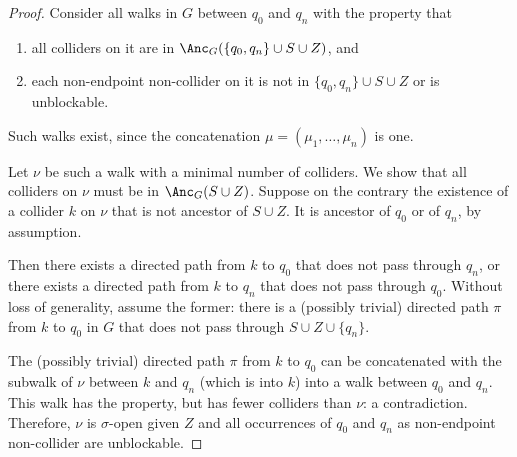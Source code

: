 \begin{proof}
  Consider all walks in $G$ between $q_0$ and $q_n$ with the property that 
  \begin{enumerate}
    \item all colliders on it are in $\Anc_{G}(\{q_0,q_n\} \cup S \cup Z)$, and 
    \item each non-endpoint non-collider on it is not in $\{q_0,q_n\} \cup S \cup Z$ or is unblockable.
  \end{enumerate}
  Such walks exist, since the concatenation $\mu = (\mu_1, \dots, \mu_n)$ is one. 

  Let $\nu$ be such a walk with a minimal number of colliders.
  We show that all colliders on $\nu$ must be in $\Anc_{G}(S \cup Z)$. 
  Suppose on the contrary the existence of a collider $k$ on $\nu$ that is not ancestor of $S \cup Z$. 
  It is ancestor of $q_0$ or of $q_n$, by assumption.

  Then there exists a directed path from $k$ to $q_0$ that does not pass through $q_n$, or there exists a directed path from $k$ to $q_n$ that does not pass through $q_0$.
  Without loss of generality, assume the former:
  there is a (possibly trivial) directed path $\pi$ from $k$ to $q_0$ in $G$ that does not pass through $S \cup Z \cup \{q_n\}$.
  
  The (possibly trivial) directed path $\pi$ from $k$ to $q_0$ can be concatenated with the subwalk of $\nu$ between $k$ and $q_n$ (which is into $k$) into a walk between $q_0$ and $q_n$.
  This walk has the property, but has fewer colliders than $\nu$: a contradiction.
  Therefore, $\nu$ is $\sigma$-open given $Z$ and all occurrences of $q_0$ and $q_n$ as non-endpoint non-collider are unblockable.
\end{proof}

